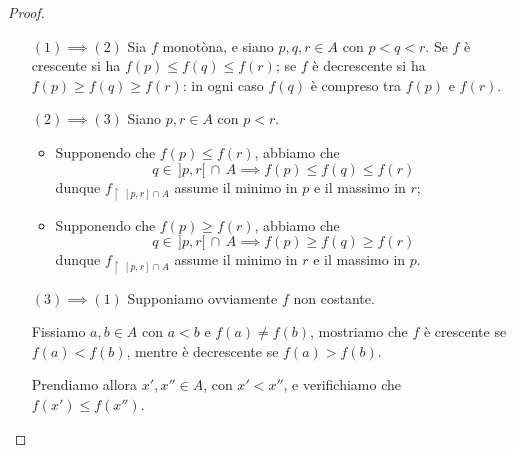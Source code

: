 \documentclass{article}
\theoremstyle{plain}
\theoremstyle{definition}
\theoremstyle{remark}
\begin{document}
\begin{proof}\hfill
    \begin{itemize}
        \item[$(1)\implies(2)$]
        Sia $f$ monotòna, e siano $p, q, r\in A$ con $p<q<r$. 
        Se $f$ è crescente si ha $f(p)\leq f(q)\leq f(r)$; se $f$ è decrescente si ha $f(p)\geq f(q)\geq f(r)$: in ogni caso $f(q)$ è compreso tra $f(p)$ e $f(r)$.
        \item[$(2)\implies(3)$] 
        Siano $p,r\in A$ con $p<r$. 
        \begin{itemize}
            \item Supponendo che $f(p)\leq f(r)$, abbiamo che \[q\in\, ]p,r[\,\cap\, A\implies f(p)\leq f(q)\leq f(r)\] dunque $f_{\upharpoonright \ [p,r]\cap A}$ assume il minimo in $p$ e il massimo in $r$;
            \item Supponendo che $f(p)\geq f(r)$, abbiamo che \[q\in\, ]p,r[\,\cap\, A\implies f(p)\geq f(q)\geq f(r)\] dunque $f_{\upharpoonright \ [p,r]\cap A}$ assume il minimo in $r$ e il massimo in $p$. 
        \end{itemize}
        \item[$(3)\implies(1)$]
        Supponiamo ovviamente $f$ non costante. 
        
        Fissiamo $a,b\in A$ con $a<b$ e $f(a)\neq f(b)$, mostriamo che $f$ è crescente se $f(a)<f(b)$, mentre è decrescente se $f(a)>f(b)$.
        
        Prendiamo allora $x',x''\in A$, con $x'<x''$, e verifichiamo che $f(x')\leq f(x'')$. 
        

\end{itemize}
\end{proof}
\end{document}
